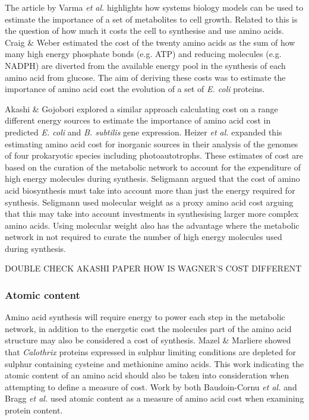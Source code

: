 The article by Varma \emph{et al.} highlights how systems biology models can be used to estimate the importance of a set of metabolites to cell growth. Related to this is the question of how much it costs the cell to synthesise and use amino acids. Craig \& Weber \cite{craig1998} estimated the cost of the twenty amino acids as the sum of how many high energy phosphate bonds (e.g. ATP) and reducing molecules (e.g. NADPH) are diverted from the available energy pool in the synthesis of each amino acid from glucose. The aim of deriving these costs was to estimate the importance of amino acid cost the evolution of a set of \emph{E. coli} proteins.

Akashi \& Gojobori \cite{akashi2002} explored a similar approach calculating cost on a range different energy sources to estimate the importance of amino acid cost in predicted \emph{E. coli} and \emph{B. subtilis} gene expression. Heizer \emph{et al.} \cite{heizer} expanded this estimating amino acid cost for inorganic sources in their analysis of the genomes of four prokaryotic species including photoautotrophs. These estimates of cost are based on the curation of the metabolic network to account for the expenditure of high energy molecules during synthesis. Seligmann argued \cite{seligmann2004} that the cost of amino acid biosynthesis must take into account more than just the energy required for synthesis. Seligmann used molecular weight as a proxy amino acid cost arguing that this may take into account investments in synthesising larger more complex amino acids. Using molecular weight also has the advantage where the metabolic network in not required to curate the number of high energy molecules used during synthesis.

DOUBLE CHECK AKASHI PAPER
HOW IS WAGNER'S COST DIFFERENT

\subsubsection{Atomic content}

Amino acid synthesis will require energy to power each step in the metabolic network, in addition to the energetic cost the molecules part of the amino acid structure may also be considered a cost of synthesis. Mazel \& Marliere \cite{mazel1989} showed that \emph{Calothrix} proteins expressed in sulphur limiting conditions are depleted for sulphur containing cysteine and methionine amino acids. This work indicating the atomic content of an amino acid should also be taken into consideration when attempting to define a measure of cost. Work by both Baudoin-Cornu \emph{et al.} \cite{baudoin2001} and Bragg \emph{et al.}	\cite{bragg2006} used atomic content as a measure of amino acid cost when examining protein content.

